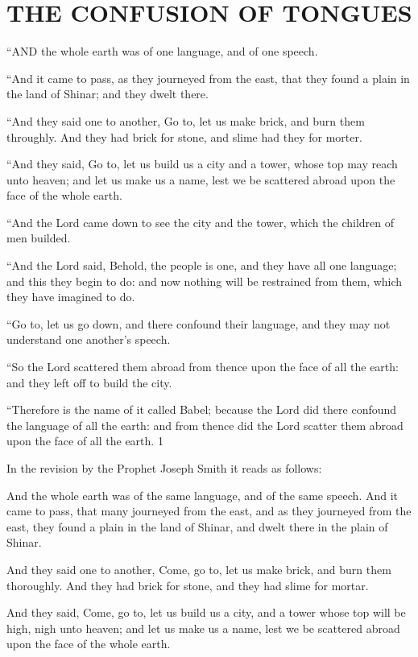 \chapter{THE CONFUSION OF TONGUES}

``AND the whole earth was of one language, and of one speech.

``And it came to pass, as they journeyed from the east, that they found a plain in the land of
Shinar; and they dwelt there.

``And they said one to another, Go to, let us make brick, and burn them throughly. And they
had brick for stone, and slime had they for morter.

``And they said, Go to, let us build us a city and a tower, whose top may reach unto heaven;
and let us make us a name, lest we be scattered abroad upon the face of the whole earth.

``And the Lord came down to see the city and the tower, which the children of men builded.

``And the Lord said, Behold, the people is one, and they have all one language; and this they
begin to do: and now nothing will be restrained from them, which they have imagined to do.

``Go to, let us go down, and there confound their language, and they may not understand one
another's speech.

``So the Lord scattered them abroad from thence upon the face of all the earth: and they left
off to build the city.

``Therefore is the name of it called Babel; because the Lord did there confound the language
of all the earth: and from thence did the Lord scatter them abroad upon the face of all the
earth. 1

In the revision by the Prophet Joseph Smith it reads as follows:

And the whole earth was of the same language, and of the same speech. And it came to pass,
that many journeyed from the east, and as they journeyed from the east, they found a plain in
the land of Shinar, and dwelt there in the plain of Shinar.

And they said one to another, Come, go to, let us make brick, and burn them thoroughly. And
they had brick for stone, and they had slime for mortar.

And they said, Come, go to, let us build us a city, and a tower whose top will be high, nigh
unto heaven; and let us make us a name, lest we be scattered abroad upon the face of the
whole earth.

